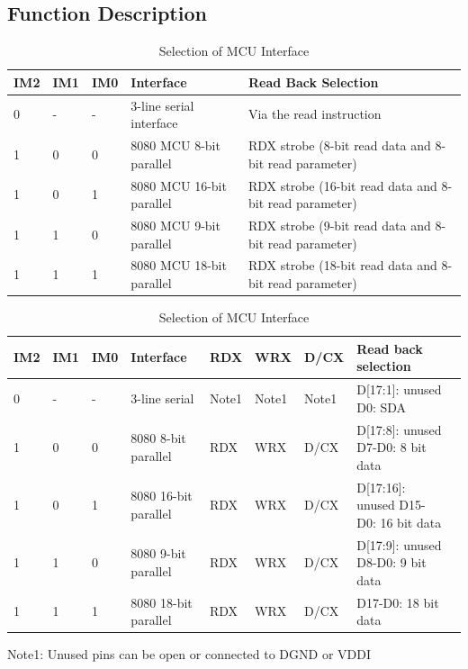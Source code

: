 \documentclass[pdflatex,sn-mathphys-num]{sn-jnl}%
\begin{document}
\subsection{Function Description}
\begin{table}[!h]
    \centering
    \begin{tabular}{l|l|l|l|l}
        \hline 
         IM2 & IM1 & IM0 & Interface & Read Back Selection  \\
         \hline
         0 & - & - & 3-line serial interface & Via the read instruction\\
         1 & 0 & 0 & 8080 MCU 8-bit parallel & RDX strobe (8-bit read data and 8-bit read parameter)\\
         1 & 0 & 1 & 8080 MCU 16-bit parallel & RDX strobe (16-bit read data and 8-bit read parameter)\\
         1 & 1 & 0 & 8080 MCU 9-bit parallel & RDX strobe (9-bit read data and 8-bit read parameter)\\
         1 & 1 & 1 & 8080 MCU 18-bit parallel & RDX strobe (18-bit read data and 8-bit read parameter)\\
 
    \end{tabular}
    \caption{Selection of MCU Interface}
    \label{tab:placeholder}
\end{table}

\begin{table}[!h]
    \centering
    \begin{tabular}{l|l|l|l|l|l|l|l|l}
        \hline 
         IM2 & IM1 & IM0 & Interface & RDX & WRX & D/CX & Read back selection  \\
         \hline
         0 & - & - & 3-line serial        & Note1 &Note1 &Note1 & D[17:1]: unused D0: SDA\\
         1 & 0 & 0 & 8080 8-bit parallel  & RDX   & WRX  & D/CX & D[17:8]: unused D7-D0: 8 bit data \\
         1 & 0 & 1 & 8080 16-bit parallel & RDX   & WRX  & D/CX & D[17:16]: unused D15-D0: 16 bit data\\
         1 & 1 & 0 & 8080 9-bit parallel  & RDX   & WRX  & D/CX & D[17:9]: unused D8-D0: 9 bit data\\
         1 & 1 & 1 & 8080 18-bit parallel & RDX   & WRX  & D/CX & D17-D0: 18 bit data\\
 
    \end{tabular}
    \caption{Selection of MCU Interface}
    \label{tab:placeholder}
\end{table}
Note1: Unused pins can be open or connected to DGND or VDDI
\end{document}
